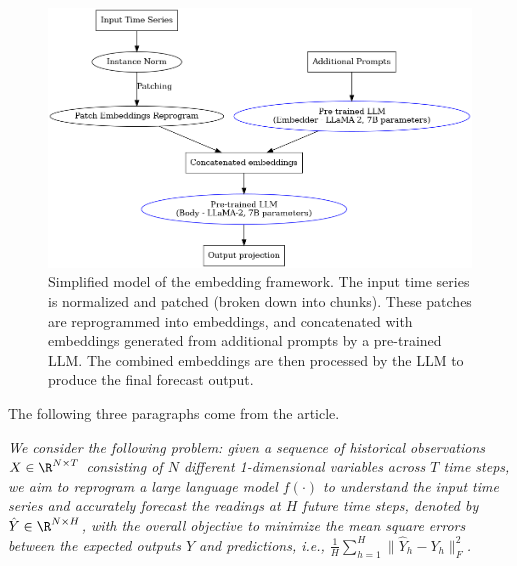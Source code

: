 \begin{figure}[h!]
	\centering
	\includegraphics[width=0.5\linewidth]{"pictures/graph.png"}
	\caption{Simplified model of the embedding framework.
		The input time series is normalized and patched (broken down into chunks). These patches are reprogrammed into embeddings,
		and concatenated with embeddings generated from additional prompts by a pre-trained LLM.
		The combined embeddings are then processed by the LLM to produce the final forecast output. }

	\label{fig:prompt_embedding_fig}
\end{figure}



The following three paragraphs come from the article.\cite{reprogramming_llm}

\textit{We consider the following problem: given a sequence of historical observations \(X \in \R^{N\times T}\)
	consisting of \(N\) different 1-dimensional variables across \(T\) time steps, we aim to reprogram a large
	language model \(f(\cdot)\) to understand the input time series and accurately forecast the readings at \(H\) future time steps, denoted by \(\hat{Y} \in \R^{N\times H}\), with the overall objective to minimize the mean square errors between the expected outputs \(Y\) and predictions, i.e., \(\frac1H \sum_{h=1}^H \| \hat{Y}_h - Y_h \|_F^2 \).}

